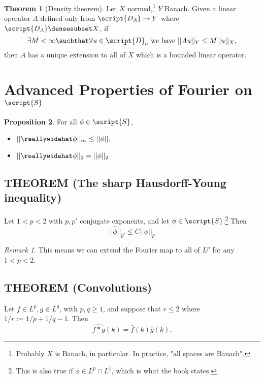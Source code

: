 \documentclass[a5paper]{article}
\theoremstyle{definition}%
\newtheorem{theorem}{Theorem}
\newtheorem{proposition}[theorem]{Proposition}
\numberwithin{exercise}{section}
\theoremstyle{remark}%
\newtheorem*{remark*}{Remark}
\renewcommand{\S}{\mathbb{S}}
\renewcommand{\L}{L}
\begin{document}
\newcommand{\D}{\script{D}}
\begin{highlight}
\begin{theorem}[Density theorem]
Let $X$ normed,\footnote{Probably $X$ is Banach, in particular. In practice, "all spaces are Banach".} $Y$ Banach. Given a linear operator $A$ defined only from $\script{D_A}\to Y$ where $\script{D_A}\densesubset X$, if 
$$\exists M<\infty \suchthat \forall u\in \D_a \text{ we have } \norm{Au}_Y\leq M\norm{u}_X,$$
then $A$ has a unique extension to all of $X$ which is a bounded linear operator. 

\end{theorem}
\end{highlight}

\renewcommand{\S}{\script{S}}
\section*{Advanced Properties of Fourier on $\S$}

\begin{highlight}
\begin{proposition} For all $\phi\in \S$, 
\begin{itemize}
\item $||{\hat{\phi}}||_\infty\leq\norm{\phi}_1$
\item $||{\hat{\phi}}||_2 = \norm{\phi}_2$
\end{itemize}
\end{proposition}
\end{highlight}

\setcounter{subsection}{6}
\subsection{THEOREM (The sharp Hausdorff-Young inequality)}

\renewcommand{\norm}[1]{||#1||}
\begin{highlight}
Let $1<p<2$ with $p,p'$ conjugate exponents, and let $\phi\in\S$.\footnote{This is also true if $\phi\in L^p\cap L^1$, which is what the book states.} Then 
\begin{equation}
\norm{\hat{\phi}}_{p'}\leq C\norm{\phi}_p \tag{$1$}
\end{equation}
\end{highlight}
\begin{remark*}
This means we can extend the Fourier map to all of $L^p$ for any $1<p<2$. 
\end{remark*}

\subsection{THEOREM (Convolutions)}
\setcounter{equation}{0}
\begin{highlight}
Let $f\in \L^p, g\in L^q$, with $p,q\geq1$, and suppose that $r\leq2$ where $1/r:=1/p+1/q-1$. Then 
\begin{equation}
\hat{f*g}(k)=\hat{f}(k)\hat{g}(k).
\end{equation}
\end{highlight}
\end{document}
